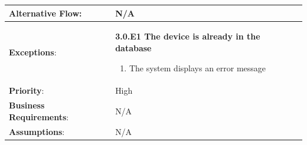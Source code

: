 \begin{table}[H]
\begin{adjustbox}{width=1.15\textwidth,center=\textwidth}
\begin{tabular}{|m{4cm}|m{12cm}|}
            \hline
            \textbf{Alternative Flow}: & N/A \\
            \hline
            \textbf{Exceptions}: & \textbf{3.0.E1  The device is already in the database}
            \begin{enumerate}
                \item The system displays an error message
            \end{enumerate} \\
            \hline
            \textbf{Priority}: & High \\
            \hline
            \textbf{Business Requirements}: & N/A \\
            \hline
            \textbf{Assumptions}: & N/A \\
            \hline
        \end{tabular}
    \end{adjustbox}
\end{table}

